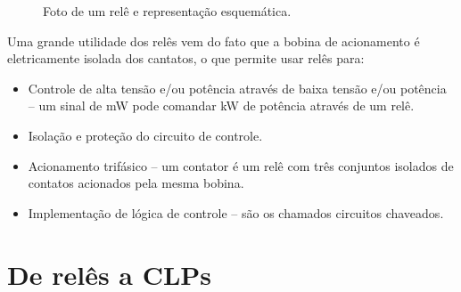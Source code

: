 \begin{figure}[!h]
  \centering
  \caption{Foto de um relê e representação esquemática.}
\end{figure}

Uma grande utilidade dos relês vem do fato que a bobina de acionamento é eletricamente isolada dos cantatos, o que permite usar relês para:
\begin{itemize}
  \item Controle de alta tensão e/ou potência através de baixa tensão e/ou potência -- um sinal de mW pode comandar kW de potência através de um relê.
  \item Isolação e proteção do circuito de controle.
  \item Acionamento trifásico -- um contator é um relê com três conjuntos isolados de contatos acionados pela mesma bobina.
  \item Implementação de lógica de controle -- são os chamados circuitos chaveados.
\end{itemize}
\section{De relês a CLPs}

